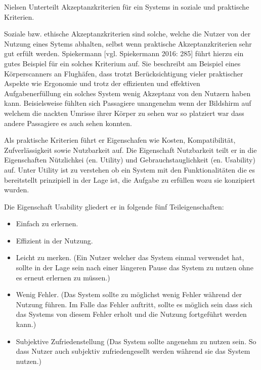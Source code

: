 Nielsen Unterteilt Akzeptanzkriterien für ein Systems in soziale und praktische Kriterien.

Soziale bzw. ethische Akzeptanzkriterien sind solche, welche  die Nutzer von der Nutzung eines Sytems abhalten, selbst wenn praktische Akzeptanzkriterien sehr gut erfült werden. 
Spiekermann [vgl. Spiekermann 2016: 285] führt hierzu ein gutes Beispiel für ein solches Kriterium auf. Sie beschreibt am Beispiel eines Körperscanners an Flughäfen, dass trotzt  Berücksichtigung vieler 
praktischer Aspekte wie Ergonomie und trotz der effizienten und effektiven Aufgabenerfüllung ein solches System wenig Akzeptanz von den Nutzern haben kann. Beisielsweise fühlten sich Passagiere 
unangenehm wenn der Bildshirm auf welchem die nackten Umrisse ihrer Körper zu sehen war so platziert war dass andere Passagiere es auch sehen konnten.  

Als praktische Kriterien führt er Eigenschafen wie Kosten, Kompatibilität, Zufverlässigkeit sowie Nutzbarkeit auf. 
Die Eigenschaft Nutzbarkeit teilt er in die Eigenschaften Nützlichkei (en. Utility) und Gebrauchstauglichkeit (en. Usability) auf. Unter Utility ist zu verstehen ob ein System mit den Funktionalitäten die es bereitstellt prinzipiell 
in der Lage ist, die Aufgabe zu erfüllen wozu sie konzipiert wurden.

Die Eigenschaft Usability gliedert er in folgende fünf Teileigenschaften: 

\begin{itemize}
	\item Einfach zu erlernen.
	\item Effizient in der Nutzung.
	\item Leicht zu merken. (Ein Nutzer welcher das System einmal verwendet hat, sollte in der Lage sein nach einer längeren Pause das System zu nutzen ohne es erneut erlernen zu müssen.)
	\item Wenig Fehler. (Das System sollte zu möglichst wenig Fehler während der Nutzung führen. Im Falle das Fehler auftritt, sollte es möglich sein dass sich das Systems von diesem Fehler erholt und die Nutzung fortgeführt werden kann.)
	\item Subjektive Zufriedenstellung (Das System sollte angenehm zu nutzen sein. So dass Nutzer auch subjektiv zufriedengesellt werden während sie das System nutzen.)
\end{itemize}

